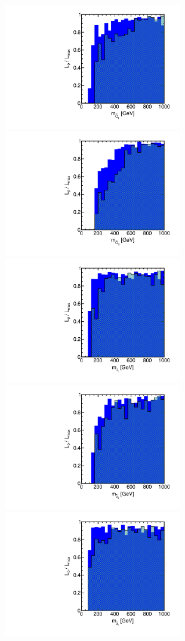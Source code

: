 \begin{figure}[htbp]
\begin{center}
\includegraphics[height=5.5cm]{figs/fig_m_Q_L.pdf} 
\includegraphics[height=5.5cm]{figs/fig_m_Q_3.pdf} \\
\includegraphics[height=5.5cm]{figs/fig_m_u_1.pdf}
\includegraphics[height=5.5cm]{figs/fig_m_u_3.pdf} \\
\includegraphics[height=5.5cm]{figs/fig_m_d_1.pdf}

\end{center}
\end{figure}
